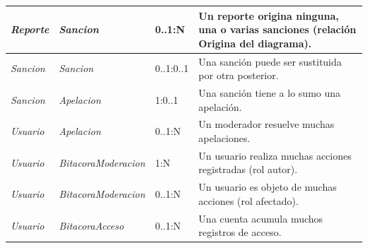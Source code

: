 \begin{center}
\begin{longtable}{|L{0.2\textwidth}|L{0.2\textwidth}|L{0.1\textwidth}|L{0.38\textwidth}|}
\textit{Reporte} & \textit{Sancion} & 0..1:N & Un reporte origina ninguna, una o varias sanciones (relación Origina del diagrama). \\ \hline
\textit{Sancion} & \textit{Sancion} & 0..1:0..1 & Una sanción puede ser sustituida por otra posterior. \\ \hline
\textit{Sancion} & \textit{Apelacion} & 1:0..1 & Una sanción tiene a lo sumo una apelación. \\ \hline
\textit{Usuario} & \textit{Apelacion} & 0..1:N & Un moderador resuelve muchas apelaciones. \\ \hline
\textit{Usuario} & \textit{Bitacora\-Moderacion} & 1:N & Un usuario realiza muchas acciones registradas (rol autor). \\ \hline
\textit{Usuario} & \textit{Bitacora\-Moderacion} & 0..1:N & Un usuario es objeto de muchas acciones (rol afectado). \\ \hline
\textit{Usuario} & \textit{Bitacora\-Acceso} & 0..1:N & Una cuenta acumula muchos registros de acceso. \\ \hline
\end{longtable}
\end{center}
